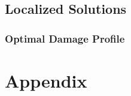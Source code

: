 \documentclass[12pt,3p]{article}
\numberwithin{equation}{section}
\begin{document}
\subsection{Localized Solutions}

\subsubsection{Optimal Damage Profile}


\newpage 
\section{Appendix}
\end{document}
